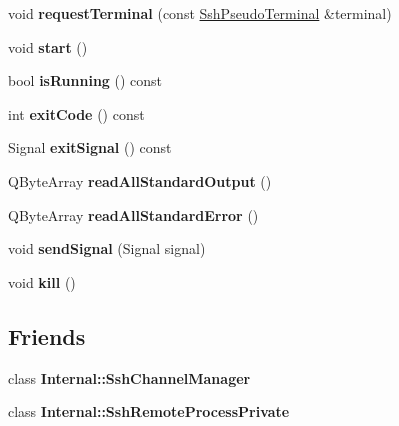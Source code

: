 \begin{DoxyCompactItemize}
void {\bfseries request\+Terminal} (const \mbox{\hyperlink{class_q_ssh_1_1_ssh_pseudo_terminal}{Ssh\+Pseudo\+Terminal}} \&terminal)
\item 
\mbox{\label{class_q_ssh_1_1_ssh_remote_process_aeca2157a118216391af511915bbcbbc2}} 
void {\bfseries start} ()
\item 
\mbox{\label{class_q_ssh_1_1_ssh_remote_process_a3f0350540382cf329fbf35febb2ea76b}} 
bool {\bfseries is\+Running} () const
\item 
\mbox{\label{class_q_ssh_1_1_ssh_remote_process_a2e5b88e2c5cdbd91ba435257e20038be}} 
int {\bfseries exit\+Code} () const
\item 
\mbox{\label{class_q_ssh_1_1_ssh_remote_process_a37faffbd287a24de8ba55885ba71f0bd}} 
Signal {\bfseries exit\+Signal} () const
\item 
\mbox{\label{class_q_ssh_1_1_ssh_remote_process_ac9034caef4737d7b52cb2994c9791625}} 
Q\+Byte\+Array {\bfseries read\+All\+Standard\+Output} ()
\item 
\mbox{\label{class_q_ssh_1_1_ssh_remote_process_ac2f51b4798a1bda1c58af866612d2628}} 
Q\+Byte\+Array {\bfseries read\+All\+Standard\+Error} ()
\item 
\mbox{\label{class_q_ssh_1_1_ssh_remote_process_aee82846b0dfe5dd9accc758432a2dd44}} 
void {\bfseries send\+Signal} (Signal signal)
\item 
\mbox{\label{class_q_ssh_1_1_ssh_remote_process_a4e0f029131afb133af94fd1292ed41bc}} 
void {\bfseries kill} ()
\end{DoxyCompactItemize}
\subsection*{Friends}
\begin{DoxyCompactItemize}
\item 
\mbox{\label{class_q_ssh_1_1_ssh_remote_process_a5a13e7a749b7e2d0ce43e5d17a60afaf}} 
class {\bfseries Internal\+::\+Ssh\+Channel\+Manager}
\item 
\mbox{\label{class_q_ssh_1_1_ssh_remote_process_a5fc1e78510af44c8659e577c4296d1ff}} 
class {\bfseries Internal\+::\+Ssh\+Remote\+Process\+Private}
\end{DoxyCompactItemize}


